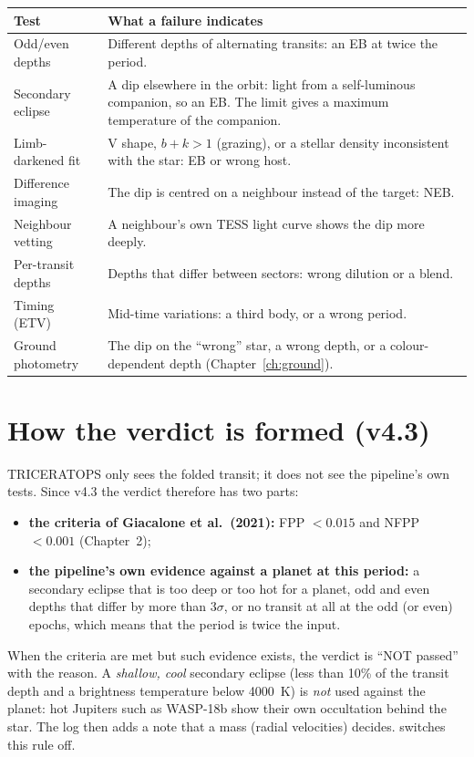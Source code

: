 \documentclass[11pt,a4paper]{report}
\newcommand{\code}[1]{\path{#1}}
\begin{document}
\begin{longtable}{@{}p{}p{}@{}}
\toprule
\textbf{Test} & \textbf{What a failure indicates}\\
\midrule\endhead
Odd/even depths & Different depths of alternating transits: an EB at twice the period.\\
Secondary eclipse & A dip elsewhere in the orbit: light from a self-luminous companion, so an EB. The limit gives a maximum temperature of the companion.\\
Limb-darkened fit & V shape, $b + k > 1$ (grazing), or a stellar density inconsistent with the star: EB or wrong host.\\
Difference imaging & The dip is centred on a neighbour instead of the target: NEB.\\
Neighbour vetting & A neighbour's own TESS light curve shows the dip more deeply.\\
Per-transit depths & Depths that differ between sectors: wrong dilution or a blend.\\
Timing (ETV) & Mid-time variations: a third body, or a wrong period.\\
Ground photometry & The dip on the ``wrong'' star, a wrong depth, or a colour-dependent depth (Chapter~\ref{ch:ground}).\\
\bottomrule
\end{longtable}

\section*{How the verdict is formed (v4.3)}
TRICERATOPS only sees the folded transit; it does not see the pipeline's own
tests. Since v4.3 the verdict therefore has two parts:
\begin{itemize}
\item \textbf{the criteria of Giacalone et al.\ (2021):} FPP $<0.015$ and
NFPP $<0.001$ (Chapter~2);
\item \textbf{the pipeline's own evidence against a planet at this period:}
a secondary eclipse that is too deep or too hot for a planet, odd and even
depths that differ by more than 3$\sigma$, or no transit at all at the odd
(or even) epochs, which means that the period is twice the input.
\end{itemize}
When the criteria are met but such evidence exists, the verdict is ``NOT
passed'' with the reason. A \emph{shallow, cool} secondary eclipse (less than
10\% of the transit depth and a brightness temperature below 4000~K) is
\emph{not} used against the planet: hot Jupiters such as WASP-18b show their
own occultation behind the star. The log then adds a note that a mass (radial
velocities) decides. \code{--no-eb-veto} switches this rule off.
\end{document}
